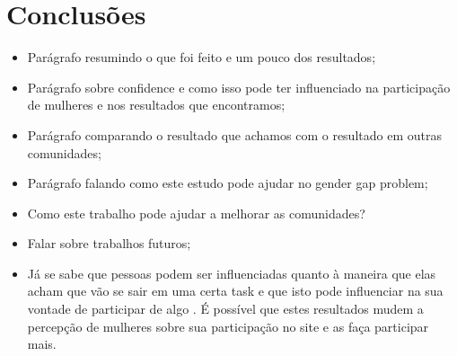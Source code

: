 \chapter{Conclusões}

\begin{itemize}
	\item Parágrafo resumindo o que foi feito e um pouco dos resultados;
	\item Parágrafo sobre confidence e como isso pode ter influenciado na participação de mulheres e nos resultados que encontramos;
	\item Parágrafo comparando o resultado que achamos com o resultado em outras comunidades;
	\item Parágrafo falando como este estudo pode ajudar no gender gap problem;
	\item Como este trabalho pode ajudar a melhorar as comunidades?
	\item Falar sobre trabalhos futuros;
	\item Já se sabe que pessoas podem ser influenciadas quanto à maneira que elas acham que vão se sair em uma certa task e que isto pode influenciar na sua vontade de participar de algo \cite{ehrlinger2003chronic}. É possível que estes resultados mudem a percepção de mulheres sobre sua participação no site e as faça participar mais.
\end{itemize}